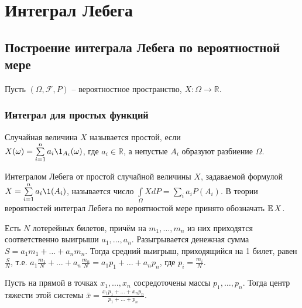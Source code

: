 \section{Интеграл Лебега}

    \subsection{Построение интеграла Лебега по вероятностной мере}
    
    Пусть $(\Omega,\mathcal{F},P)$ -- вероятностное пространство, $X:\Omega\to\mathbb{R}$.
    
    \subsubsection{Интеграл для простых функций}
    
    \begin{definition}\label{lect07:def1}
        Случайная величина $X$ называется простой, если\\ $X(\omega) = \sum\limits_{i=1}^{n}a_i\1_{A_i}(\omega)$, где $a_i \in\mathbb{R}$, а непустые $A_i$ образуют разбиение $\Omega$. 
    \end{definition}

    \begin{definition}\label{lect07:def2}
        Интегралом Лебега от простой случайной величины $X$, задаваемой формулой $X = \sum\limits_{i=1}^{n}a_i\1 (A_i)$, называется число $\int\limits_{\Omega}X dP = \sum\limits_{i}a_iP(A_i)$. В теории вероятностей интеграл Лебега по вероятностой мере принято обозначать $\operatorname*{\mathbb{E}} X$.
    \end{definition}
    
    \begin{example}
        Есть $N$ лотерейных билетов, причём на $m_1,\ldots,m_n$ из них приходятся соответственно выигрыши $a_1,\ldots,a_n$. Разыгрывается денежная сумма $S=a_1 m_1+\ldots+a_n m_n$. Тогда средний выигрыш, приходящийся на 1 билет, равен $\frac{S}{N}$, т.е. $a_1\frac{m_1}{N}+\ldots+a_n\frac{m_n}{N} = a_1 p_1 +\ldots+ a_n p_n$, где $p_i = \frac{m_i}{N}$.
    \end{example}
    
    \begin{example}
        Пусть на прямой в точках $x_1,\ldots,x_n$ сосредоточены массы $p_1,\ldots,p_n$. Тогда центр тяжести этой системы $\bar x = \frac{x_1 p_1+\ldots+x_n p_n}{p_1+\ldots+p_n}$.
    \end{example}
    
